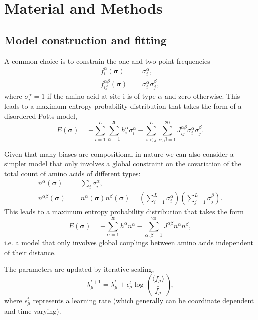 \documentclass[superscriptaddress,twocolumn,pre]{revtex4}
\newcommand{\B}{\boldsymbol}
\newcommand{\<}{\langle}
\renewcommand{\>}{\rangle}
\begin{document}
\section{Material and Methods}

\subsection{Model construction and fitting}

A common choice is to constrain the one and two-point frequencies
\begin{align}
    f_i^\alpha(\B \sigma) &= \sigma_i^\alpha, \\
    f_{ij}^{\alpha\beta}(\B \sigma) &= \sigma_i^\alpha \sigma_j^\beta,
\end{align}
where $\sigma_i^\alpha = 1$ if the amino acid at site i is of type $\alpha$ and zero otherwise.
This leads to a maximum entropy probability distribution that takes the form of a disordered Potts model,
\begin{equation}
    E(\boldsymbol \sigma) = - \sum_{i=1}^L \sum_{\alpha = 1}^{20} h_i^\alpha \sigma_i^\alpha - \sum_{i<j}^L \sum_{\alpha,\beta = 1}^{20} J_{ij}^{\alpha \beta}  \sigma_i^\alpha \sigma_j^\beta.
\end{equation}

Given that many biases are compositional in nature we can also consider a simpler model that only involves a global constraint on the covariation of the total count of amino acids of different types:
\begin{align}
    n^\alpha(\B \sigma) &= \sum_i \sigma_i^\alpha, \\
    n^{\alpha\beta}(\B \sigma) &= n^\alpha(\B \sigma) n^\beta(\B\sigma) = \left(\sum_{i=1}^L \sigma_i^\alpha\right) \left(\sum_{j=1}^L \sigma_j^\beta\right).
\end{align}
This leads to a maximum entropy probability distribution that takes the form
\begin{equation}
    E(\boldsymbol \sigma) = - \sum_{\alpha=1}^{20} h^\alpha n^\alpha -  \sum_{\alpha,\beta = 1}^{20} J^{\alpha \beta} n^\alpha n^\beta,
\end{equation}
i.e. a model that only involves global couplings between amino acids independent of their distance.


The parameters are updated by iterative scaling,
\begin{equation}
    \lambda_\mu^{t+1} = \lambda_\mu^t + \epsilon_\mu^t \log \left( \frac{\langle f_\mu \rangle}{\bar{f_\mu}} \right),
\end{equation}
where $\epsilon_\mu^t$ represents a learning rate (which generally can be coordinate dependent and time-varying).
\end{document}
